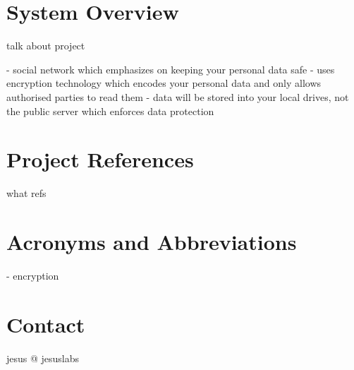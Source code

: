 \section{System Overview}
talk about project

- social network which emphasizes on keeping your personal data safe
- uses encryption technology which encodes your personal data and only allows authorised parties to read them
- data will be stored into your local drives, not the public server which enforces data protection

\section{Project References}
what refs

\section{Acronyms and Abbreviations}
- encryption

\section{Contact}
jesus @ jesuslabs